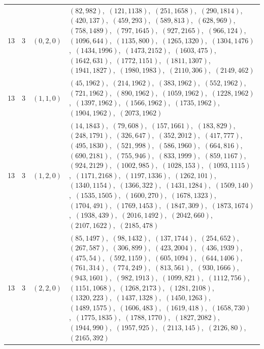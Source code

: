 \documentclass[11pt]{article}
\begin{document}
\begin{longtable}{@{}rrl>{\raggedright\arraybackslash}p{}@{}}
13 & 3 & $(0,2,0)$ & $(82,982)$,\allowbreak\ $(121,1138)$,\allowbreak\ $(251,1658)$,\allowbreak\ $(290,1814)$,\allowbreak\ $(420,137)$,\allowbreak\ $(459,293)$,\allowbreak\ $(589,813)$,\allowbreak\ $(628,969)$,\allowbreak\ $(758,1489)$,\allowbreak\ $(797,1645)$,\allowbreak\ $(927,2165)$,\allowbreak\ $(966,124)$,\allowbreak\ $(1096,644)$,\allowbreak\ $(1135,800)$,\allowbreak\ $(1265,1320)$,\allowbreak\ $(1304,1476)$,\allowbreak\ $(1434,1996)$,\allowbreak\ $(1473,2152)$,\allowbreak\ $(1603,475)$,\allowbreak\ $(1642,631)$,\allowbreak\ $(1772,1151)$,\allowbreak\ $(1811,1307)$,\allowbreak\ $(1941,1827)$,\allowbreak\ $(1980,1983)$,\allowbreak\ $(2110,306)$,\allowbreak\ $(2149,462)$\\
13 & 3 & $(1,1,0)$ & $(45,1962)$,\allowbreak\ $(214,1962)$,\allowbreak\ $(383,1962)$,\allowbreak\ $(552,1962)$,\allowbreak\ $(721,1962)$,\allowbreak\ $(890,1962)$,\allowbreak\ $(1059,1962)$,\allowbreak\ $(1228,1962)$,\allowbreak\ $(1397,1962)$,\allowbreak\ $(1566,1962)$,\allowbreak\ $(1735,1962)$,\allowbreak\ $(1904,1962)$,\allowbreak\ $(2073,1962)$\\
13 & 3 & $(1,2,0)$ & $(14,1843)$,\allowbreak\ $(79,608)$,\allowbreak\ $(157,1661)$,\allowbreak\ $(183,829)$,\allowbreak\ $(248,1791)$,\allowbreak\ $(326,647)$,\allowbreak\ $(352,2012)$,\allowbreak\ $(417,777)$,\allowbreak\ $(495,1830)$,\allowbreak\ $(521,998)$,\allowbreak\ $(586,1960)$,\allowbreak\ $(664,816)$,\allowbreak\ $(690,2181)$,\allowbreak\ $(755,946)$,\allowbreak\ $(833,1999)$,\allowbreak\ $(859,1167)$,\allowbreak\ $(924,2129)$,\allowbreak\ $(1002,985)$,\allowbreak\ $(1028,153)$,\allowbreak\ $(1093,1115)$,\allowbreak\ $(1171,2168)$,\allowbreak\ $(1197,1336)$,\allowbreak\ $(1262,101)$,\allowbreak\ $(1340,1154)$,\allowbreak\ $(1366,322)$,\allowbreak\ $(1431,1284)$,\allowbreak\ $(1509,140)$,\allowbreak\ $(1535,1505)$,\allowbreak\ $(1600,270)$,\allowbreak\ $(1678,1323)$,\allowbreak\ $(1704,491)$,\allowbreak\ $(1769,1453)$,\allowbreak\ $(1847,309)$,\allowbreak\ $(1873,1674)$,\allowbreak\ $(1938,439)$,\allowbreak\ $(2016,1492)$,\allowbreak\ $(2042,660)$,\allowbreak\ $(2107,1622)$,\allowbreak\ $(2185,478)$\\
13 & 3 & $(2,2,0)$ & $(85,1497)$,\allowbreak\ $(98,1432)$,\allowbreak\ $(137,1744)$,\allowbreak\ $(254,652)$,\allowbreak\ $(267,587)$,\allowbreak\ $(306,899)$,\allowbreak\ $(423,2004)$,\allowbreak\ $(436,1939)$,\allowbreak\ $(475,54)$,\allowbreak\ $(592,1159)$,\allowbreak\ $(605,1094)$,\allowbreak\ $(644,1406)$,\allowbreak\ $(761,314)$,\allowbreak\ $(774,249)$,\allowbreak\ $(813,561)$,\allowbreak\ $(930,1666)$,\allowbreak\ $(943,1601)$,\allowbreak\ $(982,1913)$,\allowbreak\ $(1099,821)$,\allowbreak\ $(1112,756)$,\allowbreak\ $(1151,1068)$,\allowbreak\ $(1268,2173)$,\allowbreak\ $(1281,2108)$,\allowbreak\ $(1320,223)$,\allowbreak\ $(1437,1328)$,\allowbreak\ $(1450,1263)$,\allowbreak\ $(1489,1575)$,\allowbreak\ $(1606,483)$,\allowbreak\ $(1619,418)$,\allowbreak\ $(1658,730)$,\allowbreak\ $(1775,1835)$,\allowbreak\ $(1788,1770)$,\allowbreak\ $(1827,2082)$,\allowbreak\ $(1944,990)$,\allowbreak\ $(1957,925)$,\allowbreak\ $(2113,145)$,\allowbreak\ $(2126,80)$,\allowbreak\ $(2165,392)$\\

\end{longtable}
\end{document}
